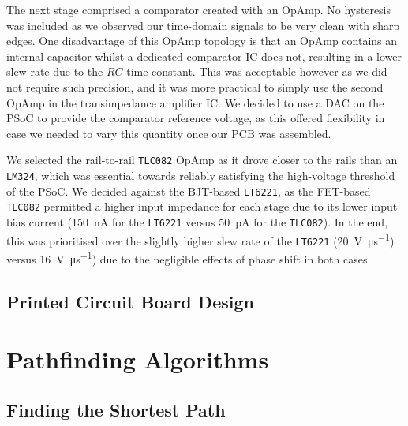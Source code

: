 \documentclass[conference]{IEEEtran}
\begin{document}
The next stage comprised a comparator created with an OpAmp.
No hysteresis was included as we observed our time-domain signals to be very clean with sharp edges.
One disadvantage of this OpAmp topology is that an OpAmp contains an internal capacitor whilst a dedicated comparator IC does not, resulting in a lower slew rate due to the $RC$ time constant.
This was acceptable however as we did not require such precision, and it was more practical to simply use the second OpAmp in the transimpedance amplifier IC.
We decided to use a DAC on the PSoC to provide the comparator reference voltage, as this offered flexibility in case we needed to vary this quantity once our PCB was assembled.

We selected the rail-to-rail \texttt{TLC082} OpAmp as it drove closer to the rails than an \texttt{LM324}, which was essential towards reliably satisfying the high-voltage threshold of the PSoC. We decided against the BJT-based \texttt{LT6221}, as the FET-based \texttt{TLC082} permitted a higher input impedance for each stage due to its lower input bias current (\qty{150}{\nA} for the \texttt{LT6221} versus \qty{50}{\pA} for the \texttt{TLC082}).
In the end, this was prioritised over the slightly higher slew rate of the \texttt{LT6221} (\qty{20}{\volt\per\us}) versus \qty{16}{\volt\per\us}) due to the negligible effects of phase shift in both cases.

\subsection{Printed Circuit Board Design}


\section{Pathfinding Algorithms \label{sect-pathfinding-algorithms}}

\subsection{Finding the Shortest Path}
\end{document}

